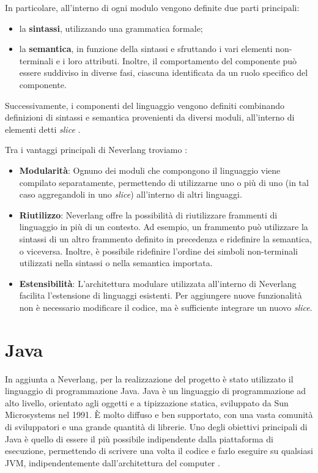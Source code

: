 \documentclass[12pt,a4paper,openright,twoside]{book}
\begin{document}
In particolare, all’interno di ogni modulo vengono definite due parti principali:
\begin{itemize}
    \item la \textbf{sintassi}, utilizzando una grammatica formale;
    \item la \textbf{semantica}, in funzione della sintassi e sfruttando i vari elementi non-terminali e i loro attributi. Inoltre, il 
    comportamento del componente può essere suddiviso in diverse fasi, ciascuna identificata da un ruolo specifico del componente.
\end{itemize}
Successivamente, i componenti del linguaggio vengono definiti combinando definizioni di sintassi e semantica provenienti da diversi moduli, 
all’interno di elementi detti \textit{slice} \cite{Vacchi2015}.

Tra i vantaggi principali di Neverlang troviamo \cite{Cazzola2012}:
\begin{itemize}
    \item \textbf{Modularità}: Ognuno dei moduli che compongono il linguaggio viene compilato separatamente, permettendo di utilizzarne uno o 
    più di uno (in tal caso aggregandoli in uno \textit{slice}) all’interno di altri linguaggi.
    \item \textbf{Riutilizzo}: Neverlang offre la possibilità di riutilizzare frammenti di linguaggio in più di un contesto. Ad esempio, un 
    frammento può utilizzare la sintassi di un altro frammento definito in precedenza e ridefinire la semantica, o viceversa. Inoltre, è 
    possibile ridefinire l’ordine dei simboli non-terminali utilizzati nella sintassi o nella semantica importata.
    \item \textbf{Estensibilità}: L’architettura modulare utilizzata all’interno di Neverlang facilita l’estensione di linguaggi esistenti. 
    Per aggiungere nuove funzionalità non è necessario modificare il codice, ma è sufficiente integrare un nuovo \textit{slice}.
\end{itemize}

\section{Java}
In aggiunta a Neverlang, per la realizzazione del progetto è stato utilizzato il linguaggio di programmazione Java. Java è un linguaggio di 
programmazione ad alto livello, orientato agli oggetti e a tipizzazione statica, sviluppato da Sun Microsystems nel 1991. È molto diffuso e 
ben supportato, con una vasta comunità di sviluppatori e una grande quantità di librerie. Uno degli obiettivi principali di Java è quello di 
essere il più possibile indipendente dalla piattaforma di esecuzione, permettendo di scrivere una volta il codice e farlo eseguire su qualsiasi 
\ac{JVM}, indipendentemente dall'architettura del computer \cite{IBMWebsite}.
\end{document}

